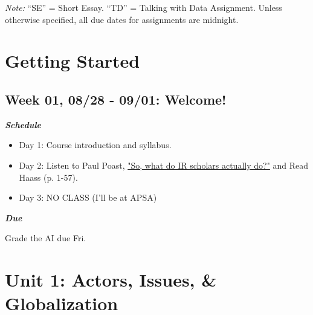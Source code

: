 \documentclass[11pt,]{article}
\begin{document}
\singlespacing
\setlength{\parskip}{0pt}

\bigskip

\hrulefill

\emph{Note:} ``SE'' = Short Essay. ``TD'' = Talking with Data
Assignment. Unless otherwise specified, all due dates for assignments
are midnight.

\hypertarget{getting-started}{%
\section{Getting Started}\label{getting-started}}

\hypertarget{week-01-0828---0901-welcome}{%
\subsection{Week 01, 08/28 - 09/01:
Welcome!}\label{week-01-0828---0901-welcome}}

\begin{multicols}{2}

\textbf{\textit{Schedule}}

\begin{itemize}

\item Day 1: Course introduction and syllabus.

\item Day 2: Listen to Paul Poast, \href{https://open.spotify.com/episode/5FHM9YyzclsjYLUhtRLk70}{"So, what do IR scholars actually do?"} and Read Haass (p. 1-57).

\item Day 3: NO CLASS (I'll be at APSA)

\end{itemize}

\columnbreak

\begin{flushright}

\textbf{\textit{Due}}

Grade the AI due Fri.

\end{flushright}

\end{multicols}

\hypertarget{unit-1-actors-issues-globalization}{%
\section{Unit 1: Actors, Issues, \&
Globalization}\label{unit-1-actors-issues-globalization}}
\end{document}
